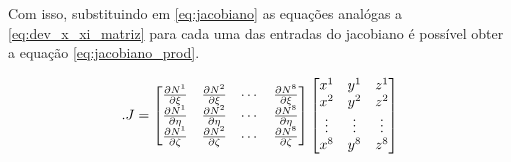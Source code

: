 Com isso, substituindo em \ref{eq:jacobiano} as equações analógas a \ref{eq:dev_x_xi_matriz} para cada uma das entradas do jacobiano é possível obter a equação \ref{eq:jacobiano_prod}.


\begin{equation}\label{eq:jacobiano_prod}.
J = \der
\begin{bmatrix}
x^1 & y^1 & z^1 \\ 
x^2 & y^2 & z^2 \\ 
\vdots & \vdots  & \vdots  \\ 
x^8 & y^8 & z^8 \\ 
\end{bmatrix}
\end{equation}


